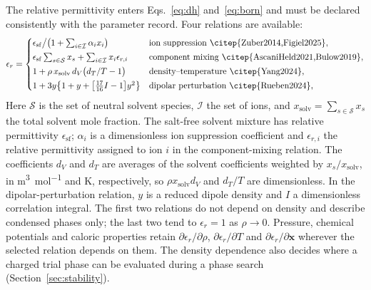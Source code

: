 The relative permittivity enters Eqs.~\eqref{eq:dh} and~\eqref{eq:born} and must be declared consistently with the parameter record.
Four relations are available:
\begin{equation}
\epsilon_r=
\begin{cases}
\epsilon_{\mathrm{sf}}\big/\bigl(1+\sum_{i\in\mathcal I}\alpha_ix_i\bigr) & \text{ion suppression~\citep{Zuber2014,Figiel2025}},\\[2pt]
\epsilon_{\mathrm{sf}}\sum_{s\in\mathcal S}x_s+\sum_{i\in\mathcal I}x_i\epsilon_{r,i} & \text{component mixing~\citep{AscaniHeld2021,Bulow2019}},\\[2pt]
1+\rho\,x_{\mathrm{solv}}\,d_{V}\bigl(d_{T}/T-1\bigr) & \text{density--temperature~\citep{Yang2024}},\\[2pt]
1+3y\bigl\{1+y+\bigl[\tfrac{17}{16}I-1\bigr]y^2\bigr\} & \text{dipolar perturbation~\citep{Rueben2024}},
\end{cases}
\label{eq:permittivity}
\end{equation}
Here $\mathcal S$ is the set of neutral solvent species, $\mathcal I$ the set of ions, and $x_{\mathrm{solv}}=\sum_{s\in\mathcal S}x_s$ the total solvent mole fraction.
The salt-free solvent mixture has relative permittivity $\epsilon_{\mathrm{sf}}$; $\alpha_i$ is a dimensionless ion suppression coefficient and $\epsilon_{r,i}$ the relative permittivity assigned to ion $i$ in the component-mixing relation.
The coefficients $d_V$ and $d_T$ are averages of the solvent coefficients weighted by $x_s/x_{\mathrm{solv}}$, in \si{\cubic\metre\per\mol} and K, respectively, so $\rho x_{\mathrm{solv}}d_V$ and $d_T/T$ are dimensionless.
In the dipolar-perturbation relation, $y$ is a reduced dipole density and $I$ a dimensionless correlation integral.
The first two relations do not depend on density and describe condensed phases only; the last two tend to $\epsilon_r=1$ as $\rho\to0$.
Pressure, chemical potentials and caloric properties retain $\partial\epsilon_r/\partial\rho$, $\partial\epsilon_r/\partial T$ and $\partial\epsilon_r/\partial\mathbf{x}$ wherever the selected relation depends on them.
The density dependence also decides where a charged trial phase can be evaluated during a phase search (Section~\ref{sec:stability}).

